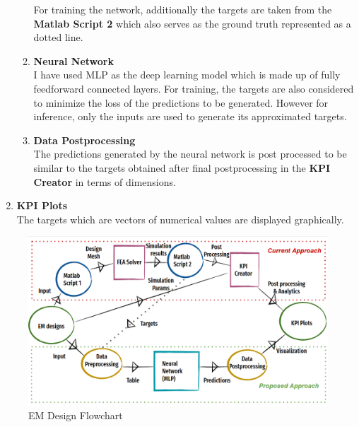 \documentclass{report} %
\begin{document}
\begin{enumerate}
\begin{enumerate}
        For training the network, additionally the targets are taken from the \textbf{Matlab Script 2} which also serves as the ground truth represented as a dotted line.
        \item \textbf{Neural Network} \\
        I have used \ac{MLP} as the deep learning model which is made up of fully feedforward connected layers. For training, the targets are also considered to minimize 
        the loss of the predictions to be generated. However for inference, only the inputs are used to generate its approximated targets.
        \item \textbf{Data Postprocessing} \\
        The predictions generated by the neural network is post processed to be similar to the targets obtained after final postprocessing in the 
        \textbf{KPI Creator} in terms of dimensions.
    \end{enumerate}    
    \item \textbf{KPI Plots} \\
    The targets which are vectors of numerical values are displayed graphically.
\end{enumerate}

\begin{figure}[H]
    \centering
    \includegraphics[width=1\textwidth]{./ReportImages/EM_design_flowchart_v2.png} 
    \caption{\ac{EM} Design Flowchart}
    \label{fig:EM Design Flowchart}
\end{figure}
\end{document}
